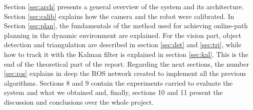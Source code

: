 Section \ref{sec:arch} presents a general overview of the system and its architecture. Section \ref{sec:calib} explains how the camera and the robot were calibrated. In Section \ref{sec:plan}, the fundamentals of the method used for achieving online-path planning in the dynamic environment are explained. For the vision part, object detection and triangulation are described in section \ref{sec:det} and \ref{sec:tri}, while how to track it with the Kalman filter is explained in section \ref{sec:kal}. This is the end of the theoretical part of the report. Regarding the next sections, the number \ref{sec:ros} explains in deep the ROS network created to implement all the previous algorithms. Sections 8 and 9 contain the experiments carried to evaluate the system and what we obtained and, finally, sections 10 and 11 present the discussion and conclusions over the whole project.


